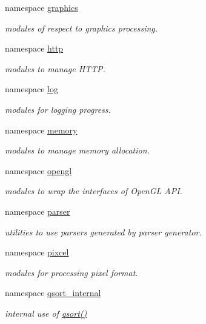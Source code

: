 \begin{DoxyCompactItemize}
namespace \hyperlink{namespacehryky_1_1graphics}{graphics}
\begin{DoxyCompactList}\small\item\em modules of respect to graphics processing. \end{DoxyCompactList}\item 
namespace \hyperlink{namespacehryky_1_1http}{http}
\begin{DoxyCompactList}\small\item\em modules to manage H\-T\-T\-P. \end{DoxyCompactList}\item 
namespace \hyperlink{namespacehryky_1_1log}{log}
\begin{DoxyCompactList}\small\item\em modules for logging progress. \end{DoxyCompactList}\item 
namespace \hyperlink{namespacehryky_1_1memory}{memory}
\begin{DoxyCompactList}\small\item\em modules to manage memory allocation. \end{DoxyCompactList}\item 
namespace \hyperlink{namespacehryky_1_1opengl}{opengl}
\begin{DoxyCompactList}\small\item\em modules to wrap the interfaces of Open\-G\-L A\-P\-I. \end{DoxyCompactList}\item 
namespace \hyperlink{namespacehryky_1_1parser}{parser}
\begin{DoxyCompactList}\small\item\em utilities to use parsers generated by parser generator. \end{DoxyCompactList}\item 
namespace \hyperlink{namespacehryky_1_1pixcel}{pixcel}
\begin{DoxyCompactList}\small\item\em modules for processing pixel format. \end{DoxyCompactList}\item 
namespace \hyperlink{namespacehryky_1_1qsort__internal}{qsort\-\_\-internal}
\begin{DoxyCompactList}\small\item\em internal use of \hyperlink{namespacehryky_a438e3ee8f5109856c4a1e4daa9980982}{qsort()} \end{DoxyCompactList}\item 

\end{DoxyCompactItemize}
